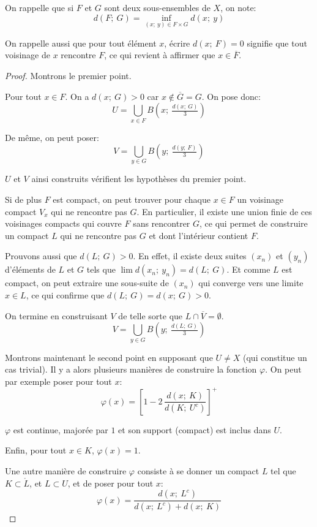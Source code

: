 \begin{listremarques}
\item
On rappelle que si $F$ et $G$ sont deux sous-ensembles de $X$, on note:
\[
d(F;~G) = \inf  \limits_{(x;~y) \in F \times G} d(x;~y)
\]
\item
On rappelle aussi que pour tout élément $x$, écrire $d(x;~F) = 0$ signifie que tout voisinage de $x$ rencontre $F$, ce qui revient à affirmer que $x \in \overline{F}$.
\end{listremarques}


\begin{proof}
Montrons le premier point.

Pour tout $x \in F$. On a $d(x;~G) > 0$ car $x \notin \overline{G} = G$. On pose donc:
\[
U = \bigcup \limits_{x \in F} B\left ( x;~\tfrac{d(x;~G)}{3}\right )
\]

De même, on peut poser:
\[
V = \bigcup \limits_{y \in G} B\left ( y;~\tfrac{d(y;~F)}{3}\right )
\]

$U$ et $V$ ainsi construits vérifient les hypothèses du premier point.

Si de plus $F$ est compact, on peut trouver pour chaque $x \in F$ un voisinage compact $V_x$ qui ne rencontre pas $G$. En particulier, il existe une union finie de ces voisinages compacts qui couvre $F$ sans rencontrer $G$, ce qui permet de construire un compact $L$ qui ne rencontre pas $G$ et dont l'intérieur contient $F$. 

Prouvons aussi que $d(L;~G)>0$. En effet, il existe deux suites $(x_n)$ et $(y_n)$ d'éléments de $L$ et $G$ tels que $\lim d(x_n;~y_n) = d(L;~G)$. Et comme $L$ est compact, on peut extraire une sous-suite de $(x_n)$ qui converge vers une limite $x \in L$, ce qui confirme que $d(L;~G) = d(x;~G) > 0$. 

On termine en construisant $V$ de telle sorte que $L \cap \overline{V} = \emptyset$.
\[
V = \bigcup \limits_{y \in G} B\left ( y;~\tfrac{d(L;~G)}{3}\right )
\]

\medskip
Montrons maintenant le second point en supposant que $U \neq X$ (qui constitue un cas trivial). Il y a alors plusieurs manières de construire la fonction $\varphi$. On peut par exemple poser pour tout $x$:
\[
\varphi(x) = \left [ 1-2 \, \frac{d(x;~K)}{d(K;~U^c)}\right ]^+
\]

$\varphi$ est continue, majorée par $1$ et son support (compact) est inclus dans $U$.

Enfin, pour tout $x \in K$, $\varphi(x)  = 1$. 

Une autre manière de construire $\varphi$ consiste à se donner un compact $L$ tel que $K \subset \mathring{L}$, et $L \subset U$, et de poser pour tout $x$:
\[
\varphi(x) = \frac{d(x;~L^c)}{d(x;~L^c) + d(x;~K)}
\]


\end{proof}
